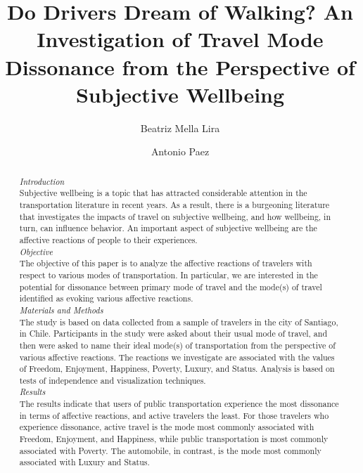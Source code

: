 \documentclass[]{elsarticle} %
\begin{document}
\begin{frontmatter}

  \title{Do Drivers Dream of Walking? An Investigation of Travel Mode Dissonance
from the Perspective of Subjective Wellbeing}
    \author[PUC]{Beatriz Mella Lira}
    \author[McMaster University]{Antonio Paez}
      \address[PUC]{BRT+ Centre of Excellence, Departamento Ingeniería de Transporte y
Logística, Escuela de Ingeniería, Pontificia Universidad Católica de
Chile}
    \address[McMaster University]{School of Earth, Environment, and Society, McMaster University, 1280
Main St W, Hamilton, Ontario, L8S 1S4 Canada}
    
  \begin{abstract}
  \emph{Introduction}\\
  Subjective wellbeing is a topic that has attracted considerable
  attention in the transportation literature in recent years. As a result,
  there is a burgeoning literature that investigates the impacts of travel
  on subjective wellbeing, and how wellbeing, in turn, can influence
  behavior. An important aspect of subjective wellbeing are the affective
  reactions of people to their experiences.\\
  \emph{Objective}\\
  The objective of this paper is to analyze the affective reactions of
  travelers with respect to various modes of transportation. In
  particular, we are interested in the potential for dissonance between
  primary mode of travel and the mode(s) of travel identified as evoking
  various affective reactions.\\
  \emph{Materials and Methods}\\
  The study is based on data collected from a sample of travelers in the
  city of Santiago, in Chile. Participants in the study were asked about
  their usual mode of travel, and then were asked to name their ideal
  mode(s) of transportation from the perspective of various affective
  reactions. The reactions we investigate are associated with the values
  of Freedom, Enjoyment, Happiness, Poverty, Luxury, and Status. Analysis
  is based on tests of independence and visualization techniques.\\
  \emph{Results}\\
  The results indicate that users of public transportation experience the
  most dissonance in terms of affective reactions, and active travelers
  the least. For those travelers who experience dissonance, active travel
  is the mode most commonly associated with Freedom, Enjoyment, and
  Happiness, while public transportation is most commonly associated with
  Poverty. The automobile, in contrast, is the mode most commonly
  associated with Luxury and Status.
  \end{abstract}
  
 \end{frontmatter}
\end{document}
